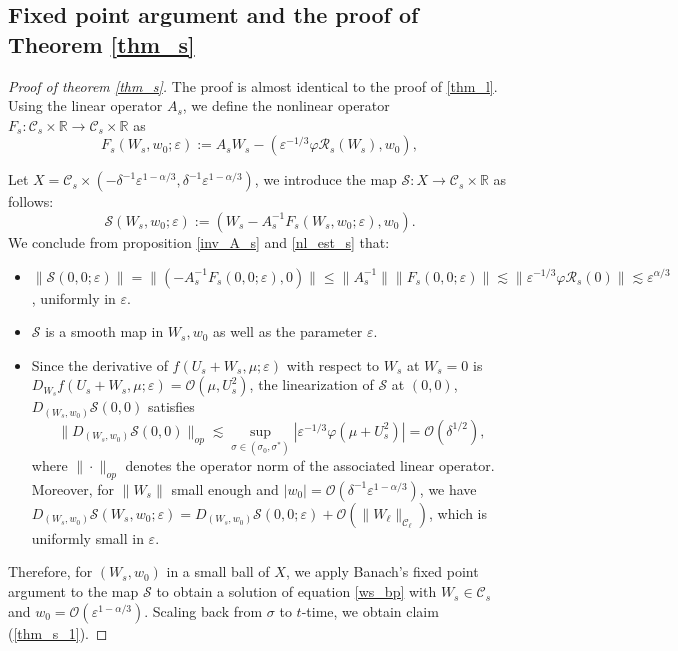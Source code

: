 \documentclass[letterpaper,11pt]{article}
\newcommand{\Ral}{\mathcal{R}}
\newcommand{\rmO}{\mathcal{O}}
\newcommand{\eps}{\varepsilon}
\newcommand{\lar}{ \lesssim }
\numberwithin{equation}{section}
\theoremstyle{plain}
\begin{document}
\subsection{Fixed point argument and the proof of Theorem \ref{thm_s}}
\begin{proof}[Proof of theorem \ref{thm_s}]
The proof is almost identical to the proof of \ref{thm_l}. Using the linear operator $A_s$, we define the nonlinear operator
$F_s : \mathcal{C}_s \times \mathbb{R} \to \mathcal{C}_s \times \mathbb{R}$ as
\[
F_s(W_s, w_0; \eps) := A_s W_s - (\eps^{-1/3}\varphi \Ral_s(W_s), w_0),
\]

Let $X = \mathcal{C}_s \times (-\delta^{-1}\eps^{1-\alpha/3},\delta^{-1}\eps^{1-\alpha/3})$, we introduce the map $\mathcal{S}: X \to \mathcal{C}_s \times \mathbb{R}$ as follows:
\[
\mathcal{S}(W_s,w_0; \eps) := (W_s-A_s^{-1}F_s(W_s,w_0;\eps), w_0).
\]
We conclude from proposition \ref{inv_A_s} and \ref{nl_est_s} that:
\begin{itemize}
\item $\|\mathcal{S}(0,0;\eps) \|= \|\left( -A_s^{-1}F_s(0,0;\eps),0\right)\| \le \|A_s^{-1}\|\|F_s(0,0;\eps)\| \lar \|\eps^{-1/3}\varphi \Ral_s(0)\| \lar \eps^{\alpha/3}$, uniformly in $\eps$.

\item $\mathcal{S}$ is a smooth map in $W_s,w_0$ as well as the parameter $\eps$.

\item Since the derivative of $f(U_s+W_s,\mu;\eps)$ with respect to $W_s$ at $W_s=0$ is $D_{W_s} f(U_s+W_s,\mu;\eps)=\rmO(\mu, U_s^2)$, the linearization of $\mathcal{S}$ at $(0,0)$, $D_{(W_s,w_0)} \mathcal{S}(0,0)$ satisfies
\[
\|D_{(W_s,w_0)} \mathcal{S}(0,0)\|_{op} \lar \sup_{\sigma \in (\sigma_0,\sigma^*)}|\eps^{-1/3}\varphi(\mu+U_s^2)| = \rmO(\delta^{1/2}),
\]
where $\|\cdot\|_{op}$ denotes the operator norm of the associated linear operator.
Moreover, for $\|W_{s}\|$ small enough and $|w_0| =\rmO(\delta^{-1}\eps^{1-\alpha/3})$, we have $D_{(W_s,w_0)}\mathcal{S}(W_s,w_0;\eps) =  D_{(W_s,w_0)}\mathcal{S}(0,0;\eps)+\rmO(\|W_\ell\|_{\mathcal{C}_\ell})$, which is uniformly small in $\eps$.


\end{itemize}

Therefore, for $(W_s, w_0)$ in a small ball of $X$, we apply Banach's fixed point argument to the map $\mathcal{S}$ to obtain a solution of equation \eqref{ws_bp} with $W_s \in \mathcal{C}_s$ and $w_0 = \rmO(\eps^{1-\alpha/3})$. Scaling back from $\sigma$ to $t$-time, we obtain claim (\ref{thm_s_1}).
\end{proof}
\end{document}
